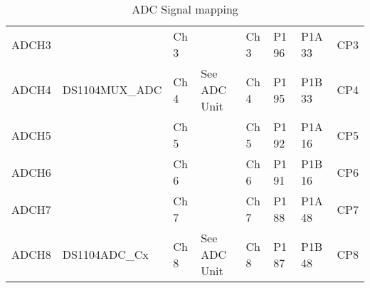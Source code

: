 \begin{table}[!h]
\begin{adjustbox}{width=1\textwidth}
\begin{tabular}{|llllllll|}
\multicolumn{1}{|l|}{ADCH3} &
  \multicolumn{1}{l|}{} &
  \multicolumn{1}{l|}{Ch 3} &
  \multicolumn{1}{l|}{} &
  \multicolumn{1}{l|}{Ch 3} &
  \multicolumn{1}{l|}{P1 96} &
  \multicolumn{1}{l|}{P1A 33} &
  CP3 \\
\multicolumn{1}{|l|}{ADCH4} &
  \multicolumn{1}{l|}{\multirow[t]{-4}{*}{DS1104MUX\_ADC}} &
  \multicolumn{1}{l|}{Ch 4} &
  \multicolumn{1}{l|}{\multirow[t]{-4}{*}{See ADC Unit}} &
  \multicolumn{1}{l|}{Ch 4} &
  \multicolumn{1}{l|}{P1 95} &
  \multicolumn{1}{l|}{P1B 33} &
  CP4 \\
\multicolumn{1}{|l|}{ADCH5} &
  \multicolumn{1}{l|}{} &
  \multicolumn{1}{l|}{Ch 5} &
  \multicolumn{1}{l|}{} &
  \multicolumn{1}{l|}{Ch 5} &
  \multicolumn{1}{l|}{P1 92} &
  \multicolumn{1}{l|}{P1A 16} &
  CP5 \\
\multicolumn{1}{|l|}{ADCH6} &
  \multicolumn{1}{l|}{} &
  \multicolumn{1}{l|}{Ch 6} &
  \multicolumn{1}{l|}{} &
  \multicolumn{1}{l|}{Ch 6} &
  \multicolumn{1}{l|}{P1 91} &
  \multicolumn{1}{l|}{P1B 16} &
  CP6 \\
\multicolumn{1}{|l|}{ADCH7} &
  \multicolumn{1}{l|}{} &
  \multicolumn{1}{l|}{Ch 7} &
  \multicolumn{1}{l|}{} &
  \multicolumn{1}{l|}{Ch 7} &
  \multicolumn{1}{l|}{P1 88} &
  \multicolumn{1}{l|}{P1A 48} &
  CP7 \\
\multicolumn{1}{|l|}{ADCH8} &
  \multicolumn{1}{l|}{\multirow[t]{-4}{*}{DS1104ADC\_Cx}} &
  \multicolumn{1}{l|}{Ch 8} &
  \multicolumn{1}{l|}{\multirow[t]{-4}{*}{See ADC Unit}} &
  \multicolumn{1}{l|}{Ch 8} &
  \multicolumn{1}{l|}{P1 87} &
  \multicolumn{1}{l|}{P1B 48} &
  CP8 \\ \hline
\end{tabular}
\end{adjustbox}
\caption{ADC Signal mapping }
\label{ADC SignalMapping}
\end{table}